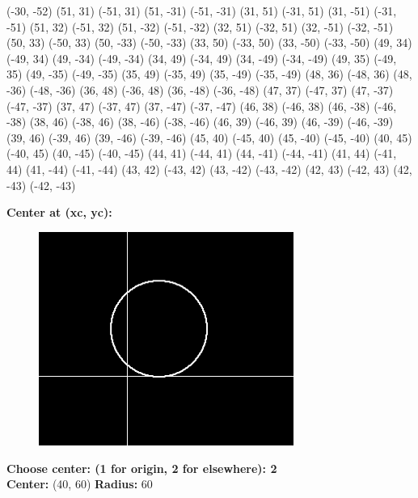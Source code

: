 \documentclass[12pt,letterpaper]{article}
\begin{document}
(-30, -52) (51, 31) (-51, 31) (51, -31) 
(-51, -31) (31, 51) (-31, 51) (31, -51) 
(-31, -51) (51, 32) (-51, 32) (51, -32) 
(-51, -32) (32, 51) (-32, 51) (32, -51) 
(-32, -51) (50, 33) (-50, 33) (50, -33) 
(-50, -33) (33, 50) (-33, 50) (33, -50) 
(-33, -50) (49, 34) (-49, 34) (49, -34) 
(-49, -34) (34, 49) (-34, 49) (34, -49) 
(-34, -49) (49, 35) (-49, 35) (49, -35) 
(-49, -35) (35, 49) (-35, 49) (35, -49) 
(-35, -49) (48, 36) (-48, 36) (48, -36) 
(-48, -36) (36, 48) (-36, 48) (36, -48) 
(-36, -48) (47, 37) (-47, 37) (47, -37) 
(-47, -37) (37, 47) (-37, 47) (37, -47) 
(-37, -47) (46, 38) (-46, 38) (46, -38) 
(-46, -38) (38, 46) (-38, 46) (38, -46) 
(-38, -46) (46, 39) (-46, 39) (46, -39) 
(-46, -39) (39, 46) (-39, 46) (39, -46) 
(-39, -46) (45, 40) (-45, 40) (45, -40) 
(-45, -40) (40, 45) (-40, 45) (40, -45) 
(-40, -45) (44, 41) (-44, 41) (44, -41) 
(-44, -41) (41, 44) (-41, 44) (41, -44) 
(-41, -44) (43, 42) (-43, 42) (43, -42) 
(-43, -42) (42, 43) (-42, 43) (42, -43) 
(-42, -43)

\newpage
\textbf{Center at (xc, yc):}
\begin{figure}[h]
    \centering
    \includegraphics[height=7cm]{Midpoint/Outputs/Quadrant.png}
\end{figure}

\textbf{Choose center: (1 for origin, 2 for elsewhere): 2}\\
\textbf{Center:} (40, 60)
\textbf{Radius:} 60\\
\end{document}

